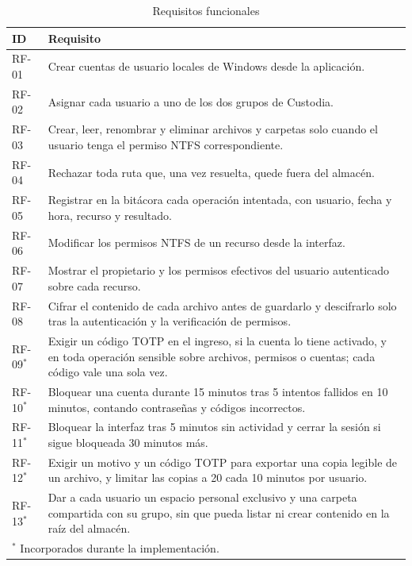 \documentclass[conference]{IEEEtran}
\begin{document}
\begin{table}[!htb]
\caption{Requisitos funcionales}
\label{tab:rf}
\centering
\footnotesize
\begin{tabular}{|l|p{7.0cm}|}
\hline
\textbf{ID} & \textbf{Requisito} \\
\hline
RF-01 & Crear cuentas de usuario locales de Windows desde la aplicación. \\
\hline
RF-02 & Asignar cada usuario a uno de los dos grupos de Custodia. \\
\hline
RF-03 & Crear, leer, renombrar y eliminar archivos y carpetas solo cuando el usuario tenga el permiso NTFS correspondiente. \\
\hline
RF-04 & Rechazar toda ruta que, una vez resuelta, quede fuera del almacén. \\
\hline
RF-05 & Registrar en la bitácora cada operación intentada, con usuario, fecha y hora, recurso y resultado. \\
\hline
RF-06 & Modificar los permisos NTFS de un recurso desde la interfaz. \\
\hline
RF-07 & Mostrar el propietario y los permisos efectivos del usuario autenticado sobre cada recurso. \\
\hline
RF-08 & Cifrar el contenido de cada archivo antes de guardarlo y descifrarlo solo tras la autenticación y la verificación de permisos. \\
\hline
RF-09$^{*}$ & Exigir un código TOTP en el ingreso, si la cuenta lo tiene activado, y en toda operación sensible sobre archivos, permisos o cuentas; cada código vale una sola vez. \\
\hline
RF-10$^{*}$ & Bloquear una cuenta durante 15 minutos tras 5 intentos fallidos en 10 minutos, contando contraseñas y códigos incorrectos. \\
\hline
RF-11$^{*}$ & Bloquear la interfaz tras 5 minutos sin actividad y cerrar la sesión si sigue bloqueada 30 minutos más. \\
\hline
RF-12$^{*}$ & Exigir un motivo y un código TOTP para exportar una copia legible de un archivo, y limitar las copias a 20 cada 10 minutos por usuario. \\
\hline
RF-13$^{*}$ & Dar a cada usuario un espacio personal exclusivo y una carpeta compartida con su grupo, sin que pueda listar ni crear contenido en la raíz del almacén. \\
\hline
\multicolumn{2}{|l|}{\scriptsize $^{*}$ Incorporados durante la implementación.} \\
\hline
\end{tabular}
\end{table}
\end{document}
